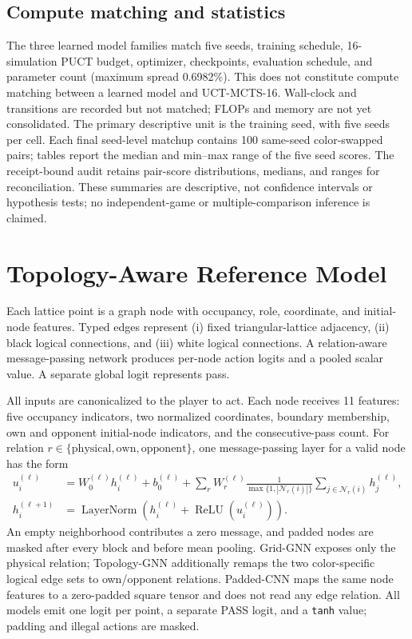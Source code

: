 \documentclass{article}
\begin{document}
\subsection{Compute matching and statistics}

The three learned model families match five seeds, training schedule,
16-simulation PUCT budget, optimizer, checkpoints, evaluation schedule, and
parameter count (maximum spread 0.6982\%). This does not constitute compute
matching between a learned model and UCT-MCTS-16. Wall-clock and transitions
are recorded but not matched; FLOPs and memory are not yet consolidated. The
primary descriptive unit is the training seed, with five seeds per cell. Each
final seed-level matchup contains 100 same-seed color-swapped pairs; tables
report the median and min--max range of the five seed scores. The receipt-bound
audit retains pair-score distributions, medians, and ranges for reconciliation.
These summaries are descriptive, not confidence intervals or hypothesis tests;
no independent-game or multiple-comparison inference is claimed.

\section{Topology-Aware Reference Model}
\label{sec:model}

Each lattice point is a graph node with occupancy, role, coordinate, and
initial-node features. Typed edges represent (i) fixed triangular-lattice
adjacency, (ii) black logical connections, and (iii) white logical connections.
A relation-aware message-passing network produces per-node action logits and a
pooled scalar value. A separate global logit represents pass.

All inputs are canonicalized to the player to act. Each node receives 11
features: five occupancy indicators, two normalized coordinates, boundary
membership, own and opponent initial-node indicators, and the consecutive-pass
count. For relation $r\in\{\mathrm{physical},\mathrm{own},\mathrm{opponent}\}$,
one message-passing layer for a valid node has the form
\begin{equation}
  \begin{aligned}
    u_i^{(\ell)}
    &= W_0^{(\ell)} h_i^{(\ell)} + b_0^{(\ell)}
       + \sum_r W_r^{(\ell)}
         \frac{1}{\max\{1,|\mathcal{N}_r(i)|\}}
         \sum_{j\in\mathcal{N}_r(i)} h_j^{(\ell)}, \\
    h_i^{(\ell+1)}
    &= \operatorname{LayerNorm}\!\left(
         h_i^{(\ell)} + \operatorname{ReLU}(u_i^{(\ell)})
       \right).
  \end{aligned}
\end{equation}
An empty neighborhood contributes a zero message, and padded nodes are masked
after every block and before mean pooling. Grid-GNN
exposes only the physical relation; Topology-GNN additionally remaps the two
color-specific logical edge sets to own/opponent relations. Padded-CNN maps the
same node features to a zero-padded square tensor and does not read any edge
relation. All models emit one logit per point, a separate PASS logit, and a
\texttt{tanh} value; padding and illegal actions are masked.
\end{document}

